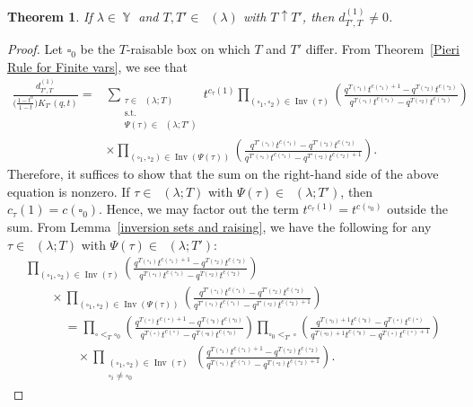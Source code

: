 \documentclass[pdftex]{sigma}
\numberwithin{equation}{section}
\newtheorem{Theorem}{Theorem}[section]
\theoremstyle{definition}
\DeclareMathOperator{\Par}{\mathbb{Y}}
\DeclareMathOperator{\PSYT}{\mathrm{PSYT}_{\geq 0}}
\DeclareMathOperator{\RSSYT}{\mathrm{RSSYT}_{\geq 0}}
\DeclareMathOperator{\Inv}{\mathrm{Inv}}
\begin{document}
\begin{Theorem}\label{non-vanishing of e_1 Pieri}
 If $\lambda \in \Par$ and $T,T' \in \RSSYT(\lambda)$ with $T \uparrow T'$, then $d_{T',T}^{(1)} \neq 0$.
\end{Theorem}
\begin{proof}
 Let $\square_0$ be the $T$-raisable box on which $T$ and $T'$ differ. From Theorem~\ref{Pieri Rule for Finite vars}, we see that
 \begin{align*}
 \frac{d^{(1)}_{T',T}}{\bigl(\frac{1-t^n}{1-t}\bigr)K_{T'}(q,t)} ={}&
 \sum_{\substack{\tau \in \PSYT(\lambda;T) \\ \text{s.t.}\\ \Psi(\tau) \in \PSYT(\lambda;T')}}
 t^{c_{\tau}(1)}
 \prod_{(\square_1,\square_2) \in \Inv(\tau)} \left( \frac{q^{T(\square_1)}t^{c(\square_1) +1} - q^{T(\square_2)}t^{c(\square_2)}}{q^{T(\square_1)}t^{c(\square_1)} - q^{T(\square_2)}t^{c(\square_2)}} \right) \\
 &\times \prod_{(\square_1,\square_2) \in \Inv(\Psi(\tau))} \left( \frac{q^{T'(\square_1)}t^{c(\square_1)} - q^{T'(\square_2)}t^{c(\square_2)}}{q^{T'(\square_1)}t^{c(\square_1)} - q^{T'(\square_2)}t^{c(\square_2) +1}} \right).
\end{align*}
Therefore, it suffices to show that the sum on the right-hand side of the above equation is nonzero. If $\tau \in \PSYT(\lambda;T)$ with $\Psi(\tau) \in \PSYT(\lambda;T')$, then $c_{\tau}(1)= c(\square_0)$. Hence, we may factor out the term $t^{c_{\tau}(1)}= t^{c(\square_0)}$ outside the sum. From Lemma~\ref{inversion sets and raising}, we have the following for any $\tau \in \PSYT(\lambda;T)$ with $\Psi(\tau) \in \PSYT(\lambda;T')$:
\begin{gather*}
 \prod_{(\square_1,\square_2) \in \Inv(\tau)} \left( \frac{q^{T(\square_1)}t^{c(\square_1) +1} - q^{T(\square_2)}t^{c(\square_2)}}{q^{T(\square_1)}t^{c(\square_1)} - q^{T(\square_2)}t^{c(\square_2)}} \right)\\
 \qquad \times
 \prod_{(\square_1,\square_2) \in \Inv(\Psi(\tau))} \left( \frac{q^{T'(\square_1)}t^{c(\square_1)} - q^{T'(\square_2)}t^{c(\square_2)}}{q^{T'(\square_1)}t^{c(\square_1)} - q^{T'(\square_2)}t^{c(\square_2) +1}} \right) \\
 \phantom{ \qquad \times}{} = \prod_{\square <_{T} \square_0} \left( \frac{q^{T(\square)}t^{c(\square) +1} - q^{T(\square_0)}t^{c(\square_0)}}{q^{T(\square)}t^{c(\square)} - q^{T(\square_0)}t^{c(\square_0)}} \right) \prod_{\square_0 <_{T'} \square} \left( \frac{q^{T(\square_0)+1}t^{c(\square_0)} - q^{T(\square)}t^{c(\square)}}{q^{T(\square_0)+1}t^{c(\square_0)} - q^{T(\square)}t^{c(\square)+1}} \right) \\
 \phantom{ \qquad\times =}{} \times \prod_{\substack{(\square_1,\square_2) \in \Inv(\tau)\\ \square_i \neq \square_0}} \left( \frac{q^{T(\square_1)}t^{c(\square_1)+1} - q^{T(\square_2)}t^{c(\square_2)}}{q^{T(\square_1)}t^{c(\square_1)} - q^{T(\square_2)}t^{c(\square_2)+1}} \right).
\end{gather*}


\end{proof}
\end{document}
